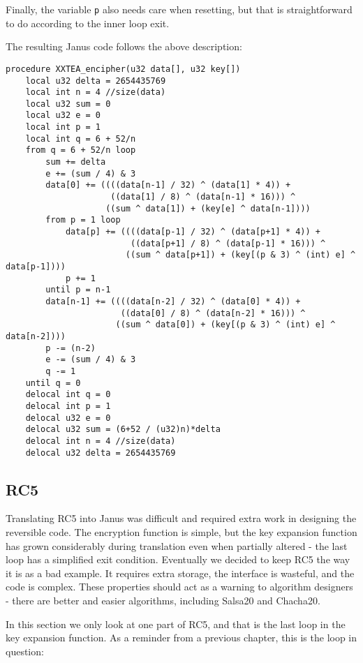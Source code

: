 \documentclass[a4paper,10pt,openright]{memoir}
\newcommand{\code}[1]{\texttt{#1}}
\begin{document}
Finally, the variable \code{p} also needs care when resetting, but that 
is straightforward to do according to the inner loop exit.

The resulting Janus code follows the above description:

\begin{lstlisting}
procedure XXTEA_encipher(u32 data[], u32 key[])
    local u32 delta = 2654435769
    local int n = 4 //size(data)
    local u32 sum = 0
    local u32 e = 0
    local int p = 1
    local int q = 6 + 52/n
    from q = 6 + 52/n loop
        sum += delta
        e += (sum / 4) & 3
        data[0] += ((((data[n-1] / 32) ^ (data[1] * 4)) +
                     ((data[1] / 8) ^ (data[n-1] * 16))) ^ 
                    ((sum ^ data[1]) + (key[e] ^ data[n-1])))
        from p = 1 loop
            data[p] += ((((data[p-1] / 32) ^ (data[p+1] * 4)) + 
                         ((data[p+1] / 8) ^ (data[p-1] * 16))) ^
                        ((sum ^ data[p+1]) + (key[(p & 3) ^ (int) e] ^ data[p-1])))
            p += 1
        until p = n-1
        data[n-1] += ((((data[n-2] / 32) ^ (data[0] * 4)) +
                       ((data[0] / 8) ^ (data[n-2] * 16))) ^
                      ((sum ^ data[0]) + (key[(p & 3) ^ (int) e] ^ data[n-2])))
        p -= (n-2)
        e -= (sum / 4) & 3
        q -= 1
    until q = 0
    delocal int q = 0
    delocal int p = 1
    delocal u32 e = 0
    delocal u32 sum = (6+52 / (u32)n)*delta
    delocal int n = 4 //size(data)
    delocal u32 delta = 2654435769
\end{lstlisting}

\subsection{RC5}

Translating RC5 into Janus was difficult and required extra work in 
designing the reversible code. The encryption function is simple, but 
the key expansion function has grown considerably during translation 
even when partially altered - the last loop has a simplified exit 
condition. Eventually we decided to keep RC5 the way it is as a bad 
example. It requires extra storage, the interface is wasteful, and the 
code is complex. These properties should act as a warning to algorithm 
designers - there are better and easier algorithms, including Salsa20 
and Chacha20.

In this section we only look at one part of RC5, and that is the last 
loop in the key expansion function. As a reminder from a previous 
chapter, this is the loop in question:
\end{document}

